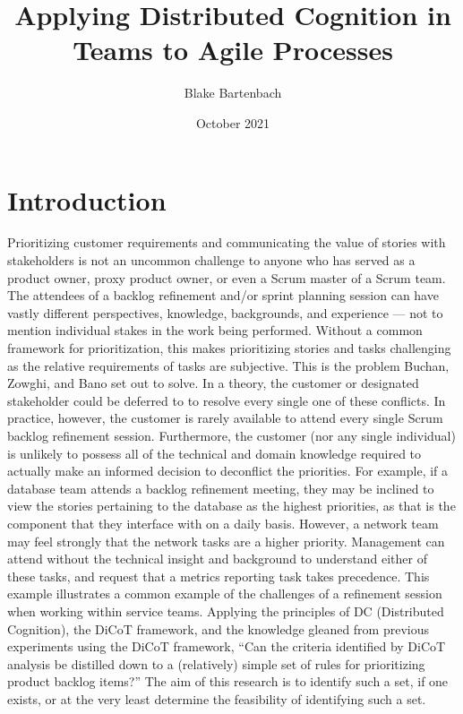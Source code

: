 \documentclass[acmsmall,screen,authorversion]{acmart}
\begin{document}
\title{Applying Distributed Cognition in Teams to Agile Processes}

\author{Blake Bartenbach}
\date{October 2021}

\begin{abstract}

\end{abstract}

\maketitle

\section{Introduction}
Prioritizing customer requirements and communicating the value of stories with stakeholders is not an uncommon challenge to anyone who has served as a product owner, proxy product owner, or even a Scrum master of a Scrum team. The attendees of a backlog refinement and/or sprint planning session can have vastly different perspectives, knowledge, backgrounds, and experience --- not to mention individual stakes in the work being performed. Without a common framework for prioritization, this makes prioritizing stories and tasks challenging as the relative requirements of tasks are subjective. This is the problem Buchan, Zowghi, and Bano set out to solve.
In a theory, the customer or designated stakeholder could be deferred to to resolve every single one of these conflicts. In practice, however, the customer is rarely available to attend every single Scrum backlog refinement session. Furthermore, the customer (nor any single individual) is unlikely to possess all of the technical and domain knowledge required to actually make an informed decision to deconflict the priorities.
For example, if a database team attends a backlog refinement meeting, they may be inclined to view the stories pertaining to the database as the highest priorities, as that is the component that they interface with on a daily basis. However, a network team may feel strongly that the network tasks are a higher priority. Management can attend without the technical insight and background to understand either of these tasks, and request that a metrics reporting task takes precedence. This example illustrates a common example of the challenges of a refinement session
when working within service teams.
Applying the principles of DC (Distributed Cognition), the DiCoT framework, and the knowledge gleaned from previous experiments using the DiCoT framework, ``Can the criteria identified by DiCoT analysis be distilled down to a (relatively) simple set of rules for prioritizing product backlog items?'' The aim of this research is to identify such a set, if one exists, or at the very least determine the feasibility of identifying such a set.
\end{document}
